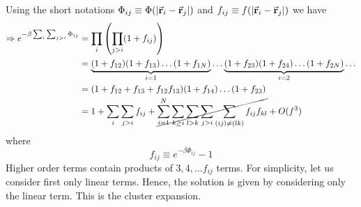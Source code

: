 \documentclass[../main/main.tex]{subfiles}
\begin{document}
 Using the short notations \(   \Phi _{ij} \equiv \Phi (\abs{\va{r}_i - \va{r}_j} ) \) and \( f_{ij} \equiv f (\abs{\va{r}_i - \va{r}_j} ) \) we have
\begin{equation*}
\begin{split}
  \Rightarrow e^{-\beta \sum_{i}^{}  \sum_{j>i}^{} \Phi _{ij}  } &= \prod_{i}^{} \qty(\prod_{j>i}^{} (1+ f_{ij})  ) \\
  & = \underbrace{(1+f_{12})(1+f_{13})  \dots ( 1 + f_{1N })}_{i=1}   \dots \underbrace{(1+f_{23}) (1+ f_{24}) \dots ( 1 + f_{2N })}_{i=2} \dots \\
  & = (1 + f_{12} + f_{13} + f_{12}f_{13}) (1+f_{14}) \dots(1+f_{23}) \\
  & = 1 + \sum_{i}^{} \sum_{j>i}^{} f_{ij} + \cancel{\sum_{i=1}^{N} \sum_{k \ge i}^{} \sum_{l > k}^{} \sum_{j > i }^{} \sum_{(ij) \neq (lk)}^{}  f_{ij} f_{kl}       } + O (f^3)
\end{split}
\end{equation*}
where
\begin{equation*}
  f_{ij} \equiv  e^{-\beta \Phi _{ij}} -1
\end{equation*}
Higher order terms contain products of \( 3,4,\dots f_{ij} \) terms. For simplicity, let us consider first only linear terms. Hence, the solution is given by considering only the linear term. This is the cluster expansion.
\end{document}
